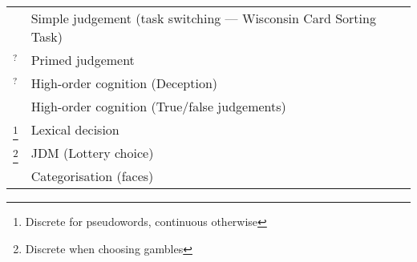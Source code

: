 \begin{longtable}{L{.5\textwidth} L{.5\textwidth} }
  \citet{Hindy2008}                                                            & Simple judgement (task switching --- Wisconsin Card Sorting Task) \\
  \citet{Xiao2014}$^?$                                                         & Primed judgement                                                  \\
  \citet{Duran2010}$^?$                                                        & High-order cognition (Deception)                                  \\
  \citet{McKinstry2008}                                                        & High-order cognition (True/false judgements)                      \\
  \citet{Barca2015}\footnote{Discrete for pseudowords, continuous otherwise}   & Lexical decision                                                  \\
  \citet{Koop2013}\footnote{Discrete when choosing gambles}                    & JDM (Lottery choice)                                              \\
  \citet{Freeman2014}                                                          & Categorisation (faces)                                            \\                                                    
\end{longtable}
